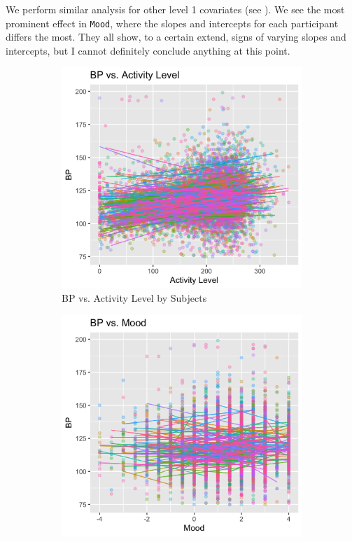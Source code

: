 \documentclass[12pt,twoside,leqno,fleqn,letterpaper]{article}
\theoremstyle{definition}
\theoremstyle{definition}
\begin{document}
We perform similar analysis for other level 1 covariates (see ). We see the most prominent effect in \texttt{Mood}, where the slopes and intercepts for each participant differs the most. They all show, to a certain extend, signs of varying slopes and intercepts, but I cannot definitely conclude anything at this point.

\begin{figure} 
    \centering
    \begin{subfigure}[b]{0.32\textwidth}
    \centering
    \includegraphics[width=\textwidth]{pics/bp v act.png}
    \caption[]%
    {{\small BP vs. Activity Level by Subjects}}
    \label{fig: bp v act}
    \end{subfigure}
    \hfill
    \begin{subfigure}[b]{0.32\textwidth}
    \centering
    \includegraphics[width=\textwidth]{pics/bp v mood.png}

\end{subfigure}
\end{figure}
\end{document}
